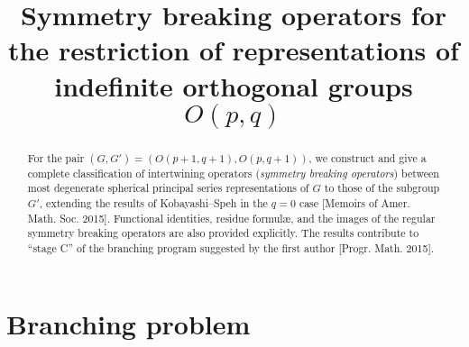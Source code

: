 \documentclass[reqno,12pt]{pja00} %
\theoremstyle{definition}
\theoremstyle{exampstyle} \newtheorem{examp}[theorem]{Theorem}
\begin{document}
\title{Symmetry breaking operators for the restriction of representations of indefinite orthogonal groups $O(p,q)$}

  \maketitle
\begin{abstract}
	For the pair $(G, G') =(O(p+1, q+1), O(p,q+1))$, we construct and give a complete classification of intertwining operators (\textit{symmetry breaking operators})
	between
most degenerate spherical
principal series representations of 
$G$ to those of the subgroup $G'$, extending the results of Kobayashi--Speh in the $q=0$ 
case [Memoirs of Amer. Math. Soc. 2015].
Functional identities, residue formul\ae, and the images of the regular symmetry breaking operators are also provided 
explicitly.
The results contribute to ``stage C'' of the branching program suggested by the first author [Progr. Math. 2015].
\end{abstract}

\section{Branching problem}
\end{document}
